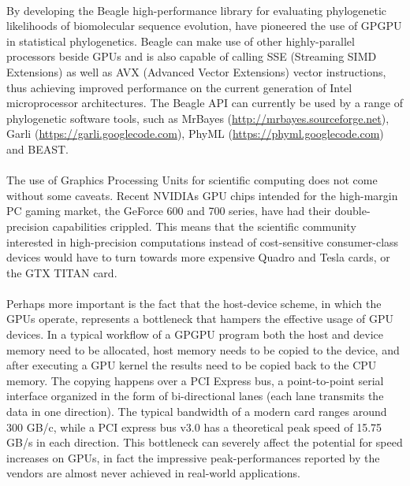 \paragraph{}
By developing the Beagle high-performance library for  evaluating phylogenetic likelihoods of biomolecular sequence evolution, \cite{Suchard2009} 
have pioneered the use of GPGPU in statistical phylogenetics.
Beagle can make use of other highly-parallel processors beside GPUs and is also capable of calling SSE (Streaming SIMD Extensions) as well as AVX (Advanced Vector Extensions) vector instructions, thus achieving improved performance on the current generation of Intel microprocessor architectures.
The Beagle API \citep{Ayres2012} can currently be used by a range of phylogenetic software tools, such as MrBayes (\url{http://mrbayes.sourceforge.net}), Garli (\url{https://garli.googlecode.com}), PhyML (\url{https://phyml.googlecode.com}) and BEAST.

\paragraph{}
The use of Graphics Processing Units for scientific computing does not come without some caveats.
Recent NVIDIAs GPU chips intended for the high-margin PC gaming market, the GeForce 600 and 700 series, have had their double-precision capabilities crippled.
This means that the scientific community interested in high-precision computations instead of cost-sensitive consumer-class devices would have to turn towards more expensive Quadro and Tesla cards, or the GTX TITAN card.

\paragraph{}
Perhaps more important is the fact that the host-device scheme, in which the GPUs operate, represents a bottleneck that hampers the effective usage of GPU devices.
In a typical workflow of a GPGPU program both the host and device memory need to be allocated, host memory needs to be copied to the device, and after executing a GPU kernel the results need to be copied back to the CPU memory.
The copying happens over a PCI Express bus, a point-to-point serial interface organized in the form of bi-directional lanes (each lane transmits the data in one direction).
The typical bandwidth of a modern card ranges around $300$ GB/c, while a PCI express bus v3.0 has a theoretical peak speed of 15.75 GB/s in each direction.
This bottleneck can severely affect the potential for speed increases on GPUs, in fact the impressive peak-performances reported by the vendors are almost never achieved in real-world applications.


